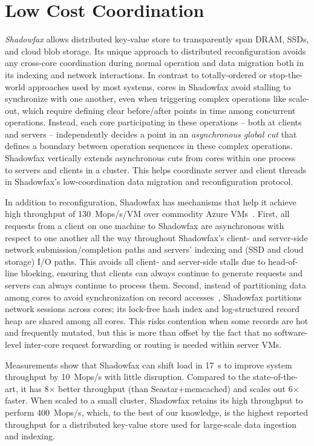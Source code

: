 \section{Low Cost Coordination}

\emph{Shadowfax} allows distributed key-value store to
transparently span DRAM, SSDs, and cloud blob storage.
%
Its unique approach to
distributed reconfiguration avoids any cross-core coordination during
normal operation and data migration both in its indexing and network interactions.
%
In contrast to totally-ordered or stop-the-world approaches used by most
systems, cores in Shadowfax avoid stalling to synchronize with one another, even when
triggering complex operations like scale-out, which require
defining clear before/after points in time among concurrent operations.
%
Instead, each core participating in these operations -- both at clients and
servers -- independently decides a point in an \emph{asynchronous global
cut} that defines a boundary between operation sequences in these complex operations.
%
Shadowfax vertically extends asynchronous cuts from cores within one
process~\cite{faster} to servers
and clients in a cluster.
%
This helps coordinate server
and client threads
in Shadowfax's low-coordination data migration and
reconfiguration protocol.

In addition to reconfiguration, Shadowfax has mechanisms that help it
achieve high throughput of 130~Mops/s/VM over
commodity Azure VMs~\cite{azure}.
%
First, all requests from a client on one machine to Shadowfax are asynchronous with
respect to one another all the way throughout Shadowfax's client- and
server-side network submission/completion paths and servers' indexing and
(SSD and cloud storage) I/O paths.
%
This avoids all client- and server-side stalls due to head-of-line
blocking, ensuring that clients can always continue to generate requests and
servers can always continue to process them.
%
Second, instead of partitioning data among cores to avoid synchronization on record
accesses~\cite{hstore,voltdb,mica,seastar}, Shadowfax partitions network
sessions across cores; its lock-free hash index and log-structured record heap
are shared among all cores.
%
This risks contention when some records are hot and frequently
mutated, but this is more than offset by the fact that no software-level
inter-core request forwarding or routing is needed within server VMs.

Measurements show that Shadowfax can shift load in 17~s to improve system throughput by
10~Mops/s
with little disruption. Compared to the state-of-the-art, it has 8$\times{}$ better throughput
  (than Seastar+memcached) and scales out 6$\times{}$ faster.
%
When scaled to a small cluster, Shadowfax retains its high throughput to
perform 400~Mops/s,
%
which, to the best of our knowledge, is the highest
reported throughput for a distributed key-value store used for
large-scale data ingestion and indexing.


